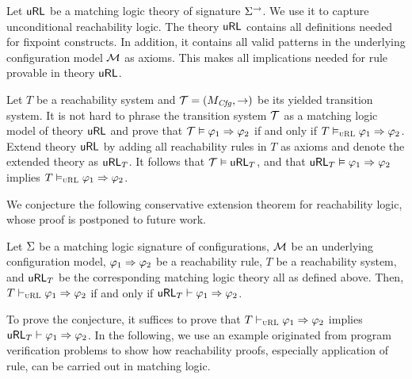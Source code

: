 \documentclass{amsart}
\begin{document}
Let $\mathsf{uRL}$ be a matching logic theory of signature ${\Sigma}^\to$.
We use it to capture unconditional reachability logic.
The theory $\mathsf{uRL}$ contains all definitions needed for fixpoint constructs.
In addition, it contains all valid patterns 
in the underlying configuration model $\mathcal{M}$ as axioms.
This makes all implications needed for  rule
provable in theory $\mathsf{uRL}$.

Let $T$ be a reachability system 
and $\mathcal{T} = (M_{\mathit{Cfg}}, \to)$ be its yielded transition system.
It is not hard to phrase the transition system $\mathcal{T}$ as a matching logic model
of theory $\mathsf{uRL}$ and prove that
$\mathcal{T} \vDash \varphi_1 \Rightarrow \varphi_2$
if and only if
$T \vDash_{\textsc{uRL}} \varphi_1 \Rightarrow \varphi_2$.
Extend theory $\mathsf{uRL}$ by adding all reachability rules in $T$ as axioms
and denote the extended theory as $\mathsf{uRL}_T$.
It follows that $\mathcal{T} \vDash \mathsf{uRL}_T$, and that
$\mathsf{uRL}_T \vDash \varphi_1 \Rightarrow \varphi_2$ implies
$T \vDash_{\textsc{uRL}} \varphi_1 \Rightarrow \varphi_2$.

We conjecture the following conservative extension theorem for
reachability logic, whose proof is postponed to future work.
\begin{conjecture}
Let ${\Sigma}$ be a matching logic signature of configurations,
$\mathcal{M}$ be an underlying configuration model,
$\varphi_1 \Rightarrow \varphi_2$ be a reachability rule,
$T$ be a reachability system,
and $\mathsf{uRL}_T$ be the corresponding matching logic theory all as defined above.
Then, $T \vdash_{\textsc{uRL}} \varphi_1 \Rightarrow \varphi_2$ if and only if
$\mathsf{uRL}_T \vdash \varphi_1 \Rightarrow \varphi_2$.
\end{conjecture}

To prove the conjecture, it suffices to prove that
$T \vdash_{\textsc{uRL}} \varphi_1 \Rightarrow \varphi_2$ implies
$\mathsf{uRL}_T \vdash \varphi_1 \Rightarrow \varphi_2$.
In the following, we use an example originated from
program verification problems to show how reachability proofs,
especially application of  rule,
can be carried out in matching logic.

\end{document}
